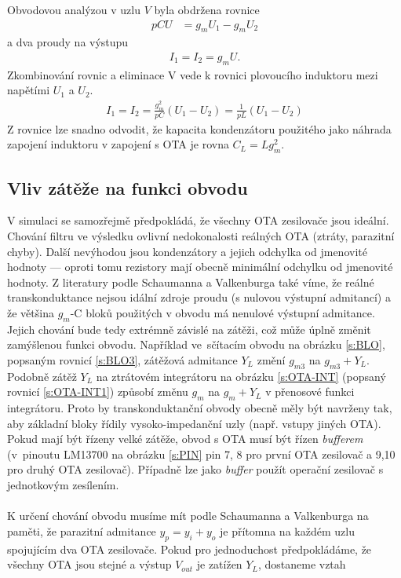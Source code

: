 Obvodovou analýzou v uzlu $V$ byla obdržena rovnice
\begin{align}
pCU &= g_mU_1 - g_mU_2
\end{align}
a dva proudy na výstupu
\begin{align}
I_1 = I_2 = g_mU.
\end{align}
Zkombinování rovnic a eliminace V vede k rovnici plovoucího induktoru mezi napětími $U_1$ a $U_2$.
\begin{align}
I_1 = I_2 = \frac{g_m^2}{pC}(U_1 - U_2) = \frac{1}{pL}(U_1 - U_2)
\end{align}
Z rovnice lze snadno odvodit, že kapacita kondenzátoru použitého jako náhrada zapojení induktoru v zapojení s OTA je rovna $C_L = L g_m ^2$. \\
\subsection{Vliv zátěže na funkci obvodu}
\noindent V simulaci se samozřejmě předpokládá, že všechny OTA zesilovače jsou ideální. Chování filtru ve výsledku ovlivní nedokonalosti reálných OTA (ztráty, parazitní chyby). Další nevýhodou jsou kondenzátory a jejich odchylka od jmenovité hodnoty --- oproti tomu rezistory mají obecně minimální odchylku od jmenovité hodnoty. Z literatury podle Schaumanna a Valkenburga \cite{13} také víme, že reálné transkonduktance nejsou idální zdroje proudu (s nulovou výstupní admitancí) a že většina $g_m$-C bloků použitých v obvodu má nenulové výstupní admitance. Jejich chování bude tedy extrémně závislé na zátěži, což může úplně změnit zamýšlenou funkci obvodu. Například ve~sčítacím obvodu na obrázku \ref{s:BLO}, popsaným rovnicí \ref{s:BLO3}, zátěžová admitance $Y_L$ změní $g_{m3}$ na $g_{m3} + Y_L$. Podobně zátěž $Y_L$ na ztrátovém integrátoru na obrázku \ref{s:OTA-INT} (popsaný rovnicí \ref{s:OTA-INT1}) způsobí změnu $g_m$ na $g_m + Y_L$ v přenosové funkci integrátoru. Proto by transkonduktanční obvody obecně měly být navrženy tak, aby základní bloky řídily vysoko-impedanční uzly (např. vstupy jiných OTA). Pokud mají být řízeny velké zátěže, obvod s OTA musí být řízen \textit{bufferem} (v~pinoutu LM13700 na obrázku \ref{s:PIN} pin 7, 8 pro první OTA zesilovač a 9,10 pro druhý OTA zesilovač). Případně lze jako \textit{buffer} použít operační zesilovač s jednotkovým zesílením.\\
\\
\noindent K určení chování obvodu musíme mít podle Schaumanna a Valkenburga \cite{13} na paměti, že parazitní admitance $y_p = y_i + y_o$ je přítomna na každém uzlu spojujícím dva OTA zesilovače. Pokud pro jednoduchost předpokládáme, že všechny OTA jsou stejné a výstup $V_{out}$ je zatížen $Y_L$, dostaneme vztah
